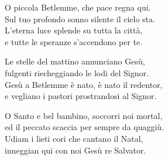 
\strofa O piccola Betlemme, che pace regna qui.\\
Sul tuo profondo sonno silente il cielo sta.\\
L’eterna luce splende su tutta la città,\\
e tutte le speranze s’accendono per te.

\spazio

\strofa Le stelle del mattino annunciano Gesù,\\
fulgenti riecheggiando le lodi del Signor.\\
Gesù a Betlemme è nato, è nato il redentor,\\
e vegliano i pastori prostrandosi al Signor.

\spazio

\strofa O Santo e bel bambino, soccorri noi mortal,\\
ed il peccato scaccia per sempre da quaggiù.\\
Udiam i lieti cori che cantano il Natal,\\
inneggian qui con noi Gesù re Salvator.